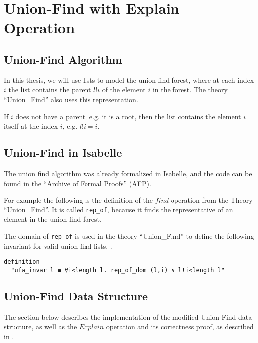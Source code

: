 
\chapter{Union-Find with Explain Operation}\label{chapter:union_find}

\section{Union-Find Algorithm}

In this thesis, we will use lists to model the union-find forest, where at each index $i$ the list contains the parent $l!i$ of the element $i$ in the forest. The theory ``Union\_Find'' also uses this representation.

If $i$ does not have a parent, e.g. it is a root, then the list contains the element $i$ itself at the index $i$, e.g. $l!i = i$.

\section{Union-Find in Isabelle}

The union find algorithm was already formalized in Isabelle, and the code can be found in the ``Archive of Formal Proofs'' (AFP)\cite{afp}.

For example the following is the definition of the $find$ operation from the Theory ``Union\_Find''\cite{Sep}. It is called \lstinline{rep_of}, because it finds the representative of an element in the union-find forest.

The domain of \lstinline{rep_of} is used in the theory ``Union\_Find'' to define the following invariant for valid union-find lists. \cite{Sep}.

\begin{lstlisting}
definition
  "ufa_invar l ≡ ∀i<length l. rep_of_dom (l,i) ∧ l!i<length l"
\end{lstlisting}

\section{Union-Find Data Structure}
\label{section:uf-data}

The section below describes the implementation of the modified Union Find data structure, as well as the $Explain$ operation and its correctness proof, as described in \cite{Nieuwenhuis}.

